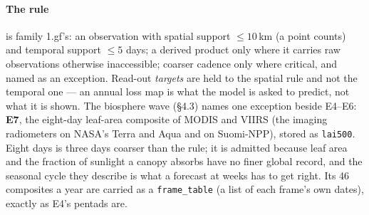 \documentclass[10pt]{article}
\newcommand{\code}[1]{\texttt{#1}}
\begin{document}
\paragraph{The rule} is family 1.gf's: an observation with spatial support
$\le 10$\,km (a point counts) and temporal support $\le 5$ days; a derived
product only where it carries raw observations otherwise inaccessible;
coarser cadence only where critical, and named as an exception. Read-out
\emph{targets} are held to the spatial rule and not the temporal one --- an
annual loss map is what the model is asked to predict, not what it is shown.
The biosphere wave (\S4.3) names one exception beside E4--E6: \textbf{E7},
the eight-day leaf-area composite of MODIS and VIIRS (the imaging
radiometers on NASA's Terra and Aqua and on Suomi-NPP), stored as
\code{lai500}. Eight days is three days coarser than the rule; it is
admitted because leaf area and the fraction of sunlight a canopy absorbs
have no finer global record, and the seasonal cycle they describe is what a
forecast at weeks has to get right. Its 46 composites a year are carried as
a \code{frame\_table} (a list of each frame's own dates), exactly as E4's
pentads are.
\end{document}
